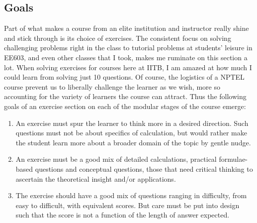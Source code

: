 \documentclass[12pt]{article}
\begin{document}
\subsection{Goals}
Part of what makes a course from an elite institution and instructor really shine and stick through is its choice of exercises. The consistent focus on solving challenging problems right in the class to tutorial problems at students' leisure in EE603, and even other classes that I took, makes me ruminate on this section a lot. When solving exercises for courses here at IITB, I am amazed at how much I could learn from solving just 10 questions. Of course, the logistics of a NPTEL course prevent us to liberally challenge the learner as we wish, more so accounting for the variety of learners the course can attract. Thus the following goals of an exercise section on each of the modular stages of the course emerge:
\begin{enumerate}
    \item An exercise must spur the learner to think more in a desired direction. Such questions must not be about specifics of calculation, but would rather make the student learn more about a broader domain of the topic by gentle nudge.
    \item An exercise must be a good mix of detailed calculations, practical formulae-based questions and conceptual questions, those that need critical thinking to ascertain the theoretical insight and/or applications. 
    \item The exercise should have a good mix of questions ranging in difficulty, from easy to difficult, with equivalent scores. But care must be put into design such that the score is not a function of the length of answer expected.
\end{enumerate}
\end{document}

